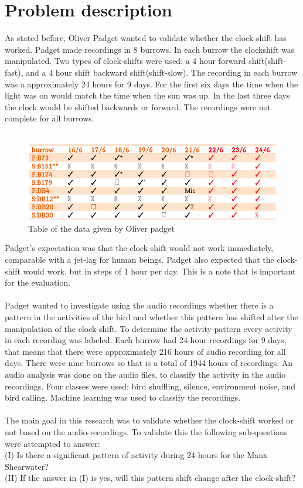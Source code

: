 \documentclass[a4paper]{article}
\begin{document}
\section*{Problem description}
As stated before, Oliver Padget wanted to validate whether the clock-shift has worked. Padget made recordings in 8 burrows. In each burrow the clockshift was manipulated. Two types of clock-shifts were used: a 4 hour forward shift(shift-fast), and a 4 hour shift backward shift(shift-slow). The recording in each burrow was a approximately 24 hours for 9 days. For the first six days the time when the light was on would match the time when the sun was up. In the last three days the clock would be shifted backwards or forward. The recordings were not complete for all burrows.\\\\
\begin{figure}[h]
\caption{Table of the data given by Oliver padget}
\includegraphics[scale=0.4]{table_of_birds.png}
\end{figure}

Padget's expectation was that the clock-shift would not work immediately, comparable with a jet-lag for human beings.
Padget also expected that the clock-shift would work, but in steps of 1 hour per day. This is a note that is important for the evaluation.\\\\
Padget wanted to investigate using the audio recordings whether there is a pattern in the activities of the bird and whether this pattern has shifted after the manipulation of the clock-shift. To determine the activity-pattern every activity in each recording was labeled. Each burrow had 24-hour recordings for 9 days, that means that there were approximately 216 hours of audio recording for all days. There were nine burrows so that is a total of 1944 hours of recordings. An audio analysis was done on the audio files, to classify the activity in the audio recordings. Four classes were used: bird shuffling, silence, environment noise, and bird calling. Machine learning was used to classify the recordings.\\\\
The main goal in this research was to validate whether the clock-shift worked or not based on the audio-recordings. To validate this the following sub-questions were attempted to answer:\\
 (I)    Is there a significant pattern of activity during 24-hours for the Manx Shearwater?\\
 (II)   If the answer in (I) is yes, will this pattern shift change after the clock-shift?\\
\end{document}
